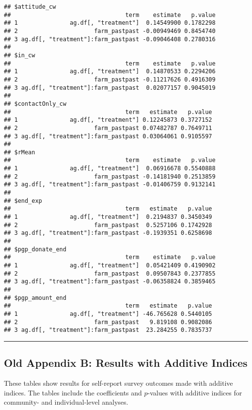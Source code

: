 \documentclass[
]{article}
\begin{document}
\begin{verbatim}
## $attitude_cw
##                                 term    estimate   p.value
## 1               ag.df[, "treatment"]  0.14549900 0.1782298
## 2                      farm_pastpast -0.00949469 0.8454740
## 3 ag.df[, "treatment"]:farm_pastpast -0.09046408 0.2780316
## 
## $in_cw
##                                 term    estimate   p.value
## 1               ag.df[, "treatment"]  0.14870533 0.2294206
## 2                      farm_pastpast -0.11217626 0.4916309
## 3 ag.df[, "treatment"]:farm_pastpast  0.02077157 0.9045019
## 
## $contactOnly_cw
##                                 term   estimate   p.value
## 1               ag.df[, "treatment"] 0.12245873 0.3727152
## 2                      farm_pastpast 0.07482787 0.7649711
## 3 ag.df[, "treatment"]:farm_pastpast 0.03064061 0.9105597
## 
## $rMean
##                                 term    estimate   p.value
## 1               ag.df[, "treatment"]  0.06916678 0.5540888
## 2                      farm_pastpast -0.14181940 0.2513859
## 3 ag.df[, "treatment"]:farm_pastpast -0.01406759 0.9132141
## 
## $end_exp
##                                 term   estimate   p.value
## 1               ag.df[, "treatment"]  0.2194837 0.3450349
## 2                      farm_pastpast  0.5257106 0.1742928
## 3 ag.df[, "treatment"]:farm_pastpast -0.1939351 0.6258698
## 
## $pgp_donate_end
##                                 term    estimate   p.value
## 1               ag.df[, "treatment"]  0.05421409 0.4190902
## 2                      farm_pastpast  0.09507843 0.2377855
## 3 ag.df[, "treatment"]:farm_pastpast -0.06358824 0.3859465
## 
## $pgp_amount_end
##                                 term   estimate   p.value
## 1               ag.df[, "treatment"] -46.765628 0.5440105
## 2                      farm_pastpast   9.819108 0.9082086
## 3 ag.df[, "treatment"]:farm_pastpast  23.284255 0.7835737
\end{verbatim}

\begin{center}\rule{0.5\linewidth}{0.5pt}\end{center}

\hypertarget{old-appendix-b-results-with-additive-indices}{%
\subsection{Old Appendix B: Results with Additive
Indices}\label{old-appendix-b-results-with-additive-indices}}

These tables show results for self-report survey outcomes made with
additive indices. The tables include the coefficients and \(p\)-values
with additive indices for community- and individual-level analyses.
\end{document}
